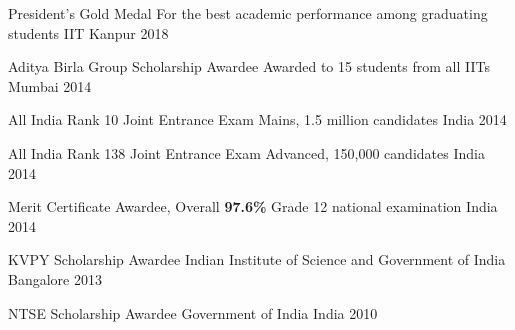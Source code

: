 
\vspace{-0.3cm}



\begin{cvhonors}


  \cvhonor
  {President's Gold Medal}
  {For the best academic performance among graduating students}
  {IIT Kanpur}
  {2018}



  \cvhonor
  {Aditya Birla Group Scholarship Awardee}
  {Awarded to 15 students from all IITs}
  {Mumbai}
  {2014}

  \cvhonor
  {All India Rank 10} %
  {Joint Entrance Exam Mains, 1.5 million candidates} %
  {India} %
  {2014} %


  \cvhonor
  {All India Rank 138} %
  {Joint Entrance Exam Advanced, 150,000 candidates} %
  {India} %
  {2014} %

  \cvhonor
  {Merit Certificate Awardee, Overall \textbf{97.6\%}}
  {Grade 12 national examination}
  {India}
  {2014}

  \cvhonor
  {KVPY Scholarship Awardee}
  {Indian Institute of Science and Government of India}
  {Bangalore}
  {2013}

  \cvhonor
  {NTSE Scholarship Awardee}
  {Government of India}
  {India}
  {2010}


\end{cvhonors}

